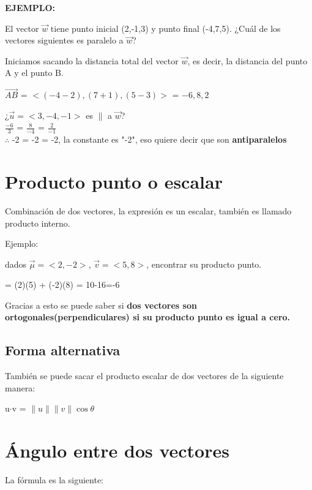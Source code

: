 \documentclass[letterpaper,12pt]{article}
\begin{document}
\begin{sloppypar}
\textbf{EJEMPLO:}

\noindent El vector $\vec{w}$ tiene punto inicial (2,-1,3) y punto final (-4,7,5). ¿Cuál de los vectores siguientes es paralelo a $\vec{w}$?

\noindent Iniciamos sacando la distancia total del vector $\vec{w}$, es decir, la distancia del punto A y el punto B.

\begin{center}
    $\vec{AB}$ = $<(-4-2),(7+1),(5-3)>$ = $-6,8,2$
\end{center}

\begin{center}
    ¿$\vec{u} = <3,-4,-1>$ es $\|$ a $\vec{w}$?
    \vspace{0.3cm}\\
    $\displaystyle \frac{-6}{3}$ = $\displaystyle \frac{8}{-4}$ = $\displaystyle \frac{2}{-1}$
    \vspace{0.3cm}\\
    $\therefore$ -2 = -2 = -2, la constante es "-2", eso quiere decir que son \textbf{antiparalelos}
\end{center}


\section{Producto punto o escalar}
\noindent Combinación de dos vectores, la expresión es un escalar, también es llamado producto interno.

\noindent Ejemplo:

\noindent dados $\vec{\mu} = <2,-2>$, $\vec{v} = <5,8>$, encontrar su producto punto.

= (2)(5) + (-2)(8) = 10-16=-6

\noindent Gracias a esto se puede saber si \textbf{dos vectores son ortogonales(perpendiculares) si su producto punto es igual a cero.}

\subsection{Forma alternativa}
\noindent También se puede sacar el producto escalar de dos vectores de la siguiente manera:

\begin{center}
    u$\cdot$v = $\|u\| \|v\| \cos\theta $
\end{center}
\section{Ángulo entre dos vectores}
\noindent La fórmula es la siguiente:


\end{sloppypar}
\end{document}
